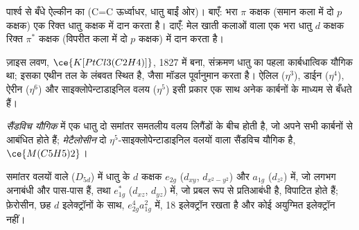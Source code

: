 \begin{omfigure}

{\small पार्श्व से बँधे ऐल्कीन का  (C=C
ऊर्ध्वाधर, धातु बाईं ओर)। बाएँ: भरा $\pi$ कक्षक (समान कला में दो $p$ कक्षक)
एक रिक्त धातु कक्षक में दान करता है। दाएँ: मेल खाती कलाओं वाला एक भरा धातु $d$ कक्षक
रिक्त $\pi^*$ कक्षक (विपरीत कला में दो $p$ कक्षक) में दान करता है।}
\end{omfigure}

ज़ाइस लवण, $\ce{K[PtCl3(C2H4)]}$, 1827 में बना, संक्रमण धातु का पहला कार्बधात्विक यौगिक
था; इसका एथीन  तल के लंबवत स्थित है, जैसा
मॉडल पूर्वानुमान करता है। ऐलिल ($\eta^3$), डाईन ($\eta^4$), ऐरीन ($\eta^6$) और साइक्लोपेन्टाडाइनिल
वलय ($\eta^5$) इसी प्रकार एक साथ अनेक कार्बनों के माध्यम से बँधते हैं।

\begin{definition}[मेटैलोसीन]\label{def:b3:organometallic-bonding:metallocene}
\emph{सैंडविच यौगिक} में एक धातु दो
समांतर समतलीय वलय लिगैंडों के बीच होती है, जो अपने सभी कार्बनों से आबंधित होते हैं;
\emph{मेटैलोसीन} दो $\eta^5$-साइक्लोपेन्टाडाइनिल
वलयों वाला सैंडविच यौगिक है, $\ce{M(C5H5)2}$।
\end{definition}

\begin{proposition}[फ़ेरोसीन के अग्रांत कक्षक]\label{prop:b3:organometallic-bonding:ferrocene}
समांतर वलयों वाले  ($D_{5d}$) में धातु के $d$ कक्षक $e_{2g}$
($d_{xy}$, $d_{x^2-y^2}$) और $a_{1g}$ ($d_{z^2}$) में, जो लगभग अनाबंधी और पास-पास हैं, तथा $e_{1g}^\ast$ ($d_{xz}$,
$d_{yz}$) में, जो प्रबल रूप से प्रतिआबंधी है, विपाटित होते हैं; फ़ेरोसीन, छह $d$ इलेक्ट्रॉनों के साथ, $e_{2g}^4a_{1g}^2$ में, 18
इलेक्ट्रॉन रखता है और कोई अयुग्मित इलेक्ट्रॉन नहीं।
\end{proposition}

